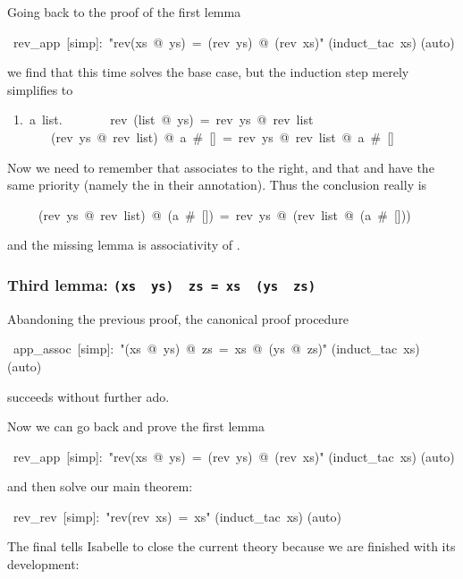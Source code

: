 \begin{isabelle}
\begin{isamarkuptext}
Going back to the proof of the first lemma%
\end{isamarkuptext}%
\ rev\_app\ [simp]:\ {"}rev(xs\ @\ ys)\ =\ (rev\ ys)\ @\ (rev\ xs){"}\isanewline
{}(induct\_tac\ xs)\isanewline
{}(auto)%
\begin{isamarkuptxt}%
\noindent
we find that this time  solves the base case, but the
induction step merely simplifies to
\begin{isabellepar}
~1.~{\isasymAnd}a~list.\isanewline
~~~~~~~rev~(list~@~ys)~=~rev~ys~@~rev~list~{\isasymLongrightarrow}\isanewline
~~~~~~~(rev~ys~@~rev~list)~@~a~\#~[]~=~rev~ys~@~rev~list~@~a~\#~[]
\end{isabellepar}%
Now we need to remember that \isa{\at} associates to the right, and that
\isa{\#} and \isa{\at} have the same priority (namely the 
in their  annotation). Thus the conclusion really is
\begin{isabellepar}%
~~~~~(rev~ys~@~rev~list)~@~(a~\#~[])~=~rev~ys~@~(rev~list~@~(a~\#~[]))%
\end{isabellepar}%
and the missing lemma is associativity of \isa{\at}.

\subsubsection*{Third lemma: \texttt{(xs \at~ys) \at~zs = xs \at~(ys \at~zs)}}

Abandoning the previous proof, the canonical proof procedure%
\end{isamarkuptxt}%
%
\begin{comment}
\isacommand{oops}%
\end{comment}
\ app\_assoc\ [simp]:\ {"}(xs\ @\ ys)\ @\ zs\ =\ xs\ @\ (ys\ @\ zs){"}\isanewline
{}(induct\_tac\ xs)\isanewline
{}(auto)%
\begin{isamarkuptext}%
\noindent
succeeds without further ado.

Now we can go back and prove the first lemma%
\end{isamarkuptext}%
\ rev\_app\ [simp]:\ {"}rev(xs\ @\ ys)\ =\ (rev\ ys)\ @\ (rev\ xs){"}\isanewline
{}(induct\_tac\ xs)\isanewline
{}(auto)%
\begin{isamarkuptext}%
\noindent
and then solve our main theorem:%
\end{isamarkuptext}%
\ rev\_rev\ [simp]:\ {"}rev(rev\ xs)\ =\ xs{"}\isanewline
{}(induct\_tac\ xs)\isanewline
{}(auto)%
\begin{isamarkuptext}%
\noindent
The final  tells Isabelle to close the current theory because
we are finished with its development:%
\end{isamarkuptext}%
\isanewline
\end{isabelle}%
